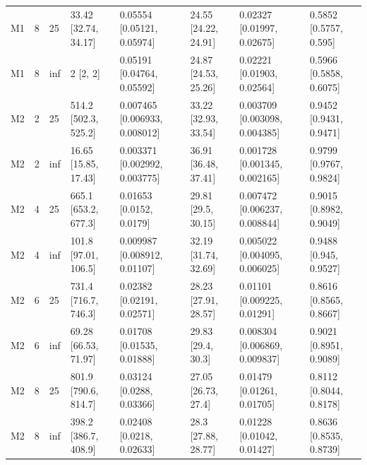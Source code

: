 \begin{tabular}{llllllll}
M1 & 8 & 25 & 33.42 [32.74, 34.17] & 0.05554 [0.05121, 0.05974] & 24.55 [24.22, 24.91] & 0.02327 [0.01997, 0.02675] & 0.5852 [0.5757, 0.595] \\
M1 & 8 & inf & 2 [2, 2] & 0.05191 [0.04764, 0.05592] & 24.87 [24.53, 25.26] & 0.02221 [0.01903, 0.02564] & 0.5966 [0.5858, 0.6075] \\
M2 & 2 & 25 & 514.2 [502.3, 525.2] & 0.007465 [0.006933, 0.008012] & 33.22 [32.93, 33.54] & 0.003709 [0.003098, 0.004385] & 0.9452 [0.9431, 0.9471] \\
M2 & 2 & inf & 16.65 [15.85, 17.43] & 0.003371 [0.002992, 0.003775] & 36.91 [36.48, 37.41] & 0.001728 [0.001345, 0.002165] & 0.9799 [0.9767, 0.9824] \\
M2 & 4 & 25 & 665.1 [653.2, 677.3] & 0.01653 [0.0152, 0.0179] & 29.81 [29.5, 30.15] & 0.007472 [0.006237, 0.008844] & 0.9015 [0.8982, 0.9049] \\
M2 & 4 & inf & 101.8 [97.01, 106.5] & 0.009987 [0.008912, 0.01107] & 32.19 [31.74, 32.69] & 0.005022 [0.004095, 0.006025] & 0.9488 [0.945, 0.9527] \\
M2 & 6 & 25 & 731.4 [716.7, 746.3] & 0.02382 [0.02191, 0.02571] & 28.23 [27.91, 28.57] & 0.01101 [0.009225, 0.01291] & 0.8616 [0.8565, 0.8667] \\
M2 & 6 & inf & 69.28 [66.53, 71.97] & 0.01708 [0.01535, 0.01888] & 29.83 [29.4, 30.3] & 0.008304 [0.006869, 0.009837] & 0.9021 [0.8951, 0.9089] \\
M2 & 8 & 25 & 801.9 [790.6, 814.7] & 0.03124 [0.0288, 0.03366] & 27.05 [26.73, 27.4] & 0.01479 [0.01261, 0.01705] & 0.8112 [0.8044, 0.8178] \\
M2 & 8 & inf & 398.2 [386.7, 408.9] & 0.02408 [0.0218, 0.02633] & 28.3 [27.88, 28.77] & 0.01228 [0.01042, 0.01427] & 0.8636 [0.8535, 0.8739] \\
\hline
\end{tabular}
